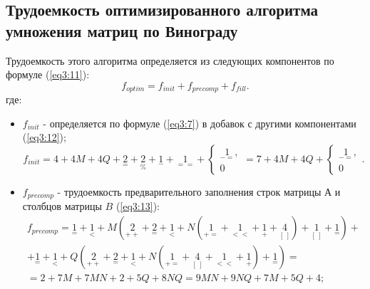 \subsection{Трудоемкость оптимизированного алгоритма умножения матриц по Винограду}
Трудоемкость этого алгоритма определяется из следующих компонентов по формуле (\ref{eq3:11}):
\begin{equation}
	f_{optim} = f_{init} + f_{precomp} + f_{fill}.
	\label{eq3:11}
\end{equation}
где:
\begin{itemize}
	\item $f_{init}$ - определяется по формуле (\ref{eq3:7}) в добавок с другими компонентами (\ref{eq3:12});
	\begin{equation}
		f_{init} = 4 + 4M + 4Q + {\underset{=}{2}} + {\underset{\%}{2}} + {\underset{-}{1}} + {\underset{==}{1}} + 
		\begin{cases}
			{\underset{-=}{1}},\\
			0
		\end{cases} = 7 + 4M + 4Q + \begin{cases}
			{\underset{-=}{1}},\\
			0
		\end{cases}.
		\label{eq3:12}
	\end{equation}
	
	\item $f_{precomp}$ - трудоемкость предварительного заполнения строк матрицы $А$ и столбцов матрицы $B$ (\ref{eq3:13}):
	\begin{multline}
		f_{precomp} = {\underset{=}{1}} + {\underset{<}{1}} + M({\underset{++}{2}} + {\underset{=}{2}} + {\underset{<}{1}} + N({\underset{+=}{1}} + {\underset{<<}{1}} + {\underset{+}{1}} + {\underset{[\ ]}{4}}) + {\underset{[\ ]}{1}} + {\underset{=}{1}}) + \\
		+ {\underset{=}{1}} + {\underset{<}{1}} + Q({\underset{++}{2}} + {\underset{=}{2}} + {\underset{<}{1}} + N({\underset{+=}{1}} + {\underset{[\ ]}{4}} + {\underset{<<}{1}} + {\underset{+}{1}}) + {\underset{=}{1}}) = \\
		= 2 + 7M + 7MN + 2 + 5Q + 8NQ = 9MN + 9NQ + 7M + 5Q + 4;
		\label{eq3:13}
	\end{multline}
	

\end{itemize}

